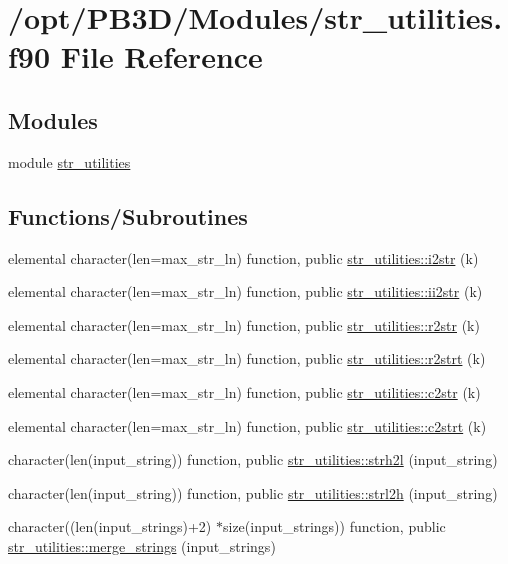\hypertarget{str__utilities_8f90}{}\section{/opt/\+P\+B3\+D/\+Modules/str\+\_\+utilities.f90 File Reference}
\label{str__utilities_8f90}
\subsection*{Modules}
\begin{DoxyCompactItemize}
\item 
module \hyperlink{namespacestr__utilities}{str\+\_\+utilities}
\end{DoxyCompactItemize}
\subsection*{Functions/\+Subroutines}
\begin{DoxyCompactItemize}
\item 
elemental character(len=max\+\_\+str\+\_\+ln) function, public \hyperlink{namespacestr__utilities_a0b97e51770725a3e98ed393d26681414}{str\+\_\+utilities\+::i2str} (k)
\item 
elemental character(len=max\+\_\+str\+\_\+ln) function, public \hyperlink{namespacestr__utilities_acb8c4e66aead51f178e47fdea8d7a7db}{str\+\_\+utilities\+::ii2str} (k)
\item 
elemental character(len=max\+\_\+str\+\_\+ln) function, public \hyperlink{namespacestr__utilities_a92ac6c0af1979df094de1caddd28ade0}{str\+\_\+utilities\+::r2str} (k)
\item 
elemental character(len=max\+\_\+str\+\_\+ln) function, public \hyperlink{namespacestr__utilities_ac778d706b2e021672618939ab58fdd32}{str\+\_\+utilities\+::r2strt} (k)
\item 
elemental character(len=max\+\_\+str\+\_\+ln) function, public \hyperlink{namespacestr__utilities_a308e943e5e244e3e0f852f2ecb3e3183}{str\+\_\+utilities\+::c2str} (k)
\item 
elemental character(len=max\+\_\+str\+\_\+ln) function, public \hyperlink{namespacestr__utilities_abca28d6272d447dc1c0c100624c6ed75}{str\+\_\+utilities\+::c2strt} (k)
\item 
character(len(input\+\_\+string)) function, public \hyperlink{namespacestr__utilities_a219964a283968cc6a968db0197d2187e}{str\+\_\+utilities\+::strh2l} (input\+\_\+string)
\item 
character(len(input\+\_\+string)) function, public \hyperlink{namespacestr__utilities_a7e2e441d509c12045a3373819040a806}{str\+\_\+utilities\+::strl2h} (input\+\_\+string)
\item 
character((len(input\+\_\+strings)+2) $\ast$size(input\+\_\+strings)) function, public \hyperlink{namespacestr__utilities_a6ab16f33c155db79844279c6a56a494c}{str\+\_\+utilities\+::merge\+\_\+strings} (input\+\_\+strings)
\end{DoxyCompactItemize}
